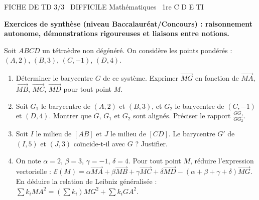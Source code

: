 \documentclass[11pt]{article}
\begin{document}
\begin{tcolorbox}[enhanced,colback=popink,colframe=popink,arc=10pt,boxrule=0pt,left=12pt,right=12pt,top=9pt,bottom=9pt]
{\color{white}\popxbold\small FICHE DE TD 3/3 \textbullet\ DIFFICILE \hfill Mathématiques \textbullet\ 1re C D E TI\par}
\end{tcolorbox}
\vspace{4pt}
\textbf{Exercices de synthèse (niveau Baccalauréat/Concours) : raisonnement autonome, démonstrations rigoureuses et liaisons entre notions.}

\begin{exercice}
Soit $ABCD$ un tétraèdre non dégénéré. On considère les points pondérés : $(A, 2)$, $(B, 3)$, $(C, -1)$, $(D, 4)$.
\begin{enumerate}
    \item Déterminer le barycentre $G$ de ce système. Exprimer $\overrightarrow{MG}$ en fonction de $\overrightarrow{MA}$, $\overrightarrow{MB}$, $\overrightarrow{MC}$, $\overrightarrow{MD}$ pour tout point $M$.
    \item Soit $G_1$ le barycentre de $(A, 2)$ et $(B, 3)$, et $G_2$ le barycentre de $(C, -1)$ et $(D, 4)$. Montrer que $G$, $G_1$ et $G_2$ sont alignés. Préciser le rapport $\frac{GG_1}{GG_2}$.
    \item Soit $I$ le milieu de $[AB]$ et $J$ le milieu de $[CD]$. Le barycentre $G'$ de $(I, 5)$ et $(J, 3)$ coïncide-t-il avec $G$ ? Justifier.
    \item On note $\alpha = 2$, $\beta = 3$, $\gamma = -1$, $\delta = 4$. Pour tout point $M$, réduire l'expression vectorielle :
    $\mathcal{E}(M) = \alpha \overrightarrow{MA} + \beta \overrightarrow{MB} + \gamma \overrightarrow{MC} + \delta \overrightarrow{MD} - (\alpha+\beta+\gamma+\delta)\overrightarrow{MG}$.
    En déduire la relation de Leibniz généralisée : $\sum k_i MA^2 = (\sum k_i) MG^2 + \sum k_i GA^2$.
\end{enumerate}
\end{exercice}
\end{document}
